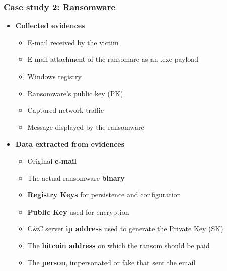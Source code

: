 \begin{frame}
    \frametitle{Case study 2: Ransomware}
    \begin{itemize}
        \item[] \textbf{Collected evidences}
        \begin{itemize}
            \item E-mail received by the victim
            \item E-mail attachment of the ransomare as an .exe payload
            \item Windows registry
            \item Ransomware's public key (PK)
            \item Captured network traffic
            \item Message displayed by the ransomware
        \end{itemize}
    \end{itemize}
    \begin{itemize}
        \item[] \textbf{Data extracted from evidences}
        \begin{itemize}
            \item Original \textbf{e-mail}
            \item The actual ransomware \textbf{binary}
            \item \textbf{Registry Keys} for persistence and configuration
            \item \textbf{Public Key} used for encryption
            \item C\&C server \textbf{ip address} used to generate the Private Key (SK)
            \item The \textbf{bitcoin address} on which the ransom should be paid
            \item The \textbf{person}, impersonated or fake that sent the email
        \end{itemize}
    \end{itemize}
\end{frame}

